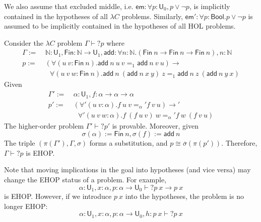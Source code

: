 We also assume that excluded middle, i.e. $\mathsf{em} : \forall p : \mathsf{U}_0, p \lor \neg p$,
is implicitly contained in the hypotheses of all $\lambda C$ problems. Similarly, $\mathsf{em}' : \forall p : \mathsf{Bool}. p \lor \neg p$
is assumed to be implicitly contained in the hypotheses of all HOL problems.

\begin{example} Consider the $\lambda C$ problem $\Gamma \vdash? p$ where
\begin{align*}
  \Gamma := \ & \mathbb{N} : \mathsf{U}_1, \mathsf{Fin} : \mathbb{N} \to \mathsf{U}_1,
  \mathsf{add} : \forall n : \mathbb{N}. (\mathsf{Fin} \ n \to \mathsf{Fin} \ n \to \mathsf{Fin} \ n), n : \mathbb{N} \\
  p := \ & (\forall (u \ v : \mathsf{Fin} \ n). \mathsf{add} \ n \ u \ v =_1 \mathsf{add} \ n \ v \ u) \to \\
  & \ \ \ \forall (u \ v \ w : \mathsf{Fin} \ n). \mathsf{add} \ n \ (\mathsf{add} \ n \ x \ y) \ z =_1 \mathsf{add} \ n \ z \ (\mathsf{add} \ n \ y \ x)
\end{align*}
Given
\begin{align*}
  \Gamma' := \ & \alpha : \mathsf{U}_1, f : \alpha \to \alpha \to \alpha \\
  p' := \ & (\forall' (u \ v : \alpha). f \ u \ v =_\alpha' f \ v \ u) \to' \\
  & \ \ \ \forall' (u \ v \ w : \alpha). f \ (f \ u \ v) \ w =_\alpha' f \ w \ (f \ v \ u)
\end{align*}
The higher-order problem $\Gamma' \vdash? p'$ is provable. Moreover, given
$$\sigma(\alpha) := \mathsf{Fin} \ n, \sigma(f) := \mathsf{add} \ n$$
The triple $(\pi(\Gamma'), \Gamma, \sigma)$ forms a substitution, and $p \cong \overline{\sigma}(\pi(p'))$.
Therefore, $\Gamma \vdash? p$ is EHOP.
\end{example}

Note that moving implications in the goal into hypotheses (and vice versa) may
change the EHOP status of a problem. For example,
$$\alpha : \mathsf{U}_1, x : \alpha, p : \alpha \to \mathsf{U}_0 \vdash? p \ x \to p \ x$$
is EHOP. However, if we introduce $p \ x$ into the hypotheses, the problem is no longer EHOP:
\begin{equation}\label{hypnehop}
  \alpha : \mathsf{U}_1, x : \alpha, p : \alpha \to \mathsf{U}_0, h : p \ x \vdash? p \ x
\end{equation}

